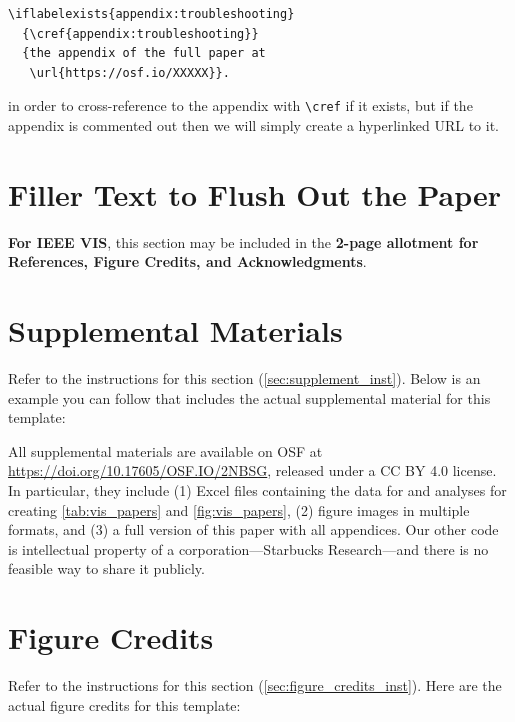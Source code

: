 \documentclass[journal]{vgtc}                     %
\begin{document}
\begin{verbatim}
\iflabelexists{appendix:troubleshooting}
  {\cref{appendix:troubleshooting}}
  {the appendix of the full paper at
   \url{https://osf.io/XXXXX}}.
\end{verbatim}

in order to cross-reference to the appendix with \verb|\cref| if it exists, but if the appendix is commented out then we will simply create a hyperlinked URL to it.


\section{Filler Text to Flush Out the Paper}

\lipsum[1-3]%



\textbf{For IEEE VIS}, this section may be included in the \textbf{2-page allotment for References, Figure Credits, and Acknowledgments}.


\section*{Supplemental Materials}
\label{sec:supplemental_materials}

Refer to the instructions for this section (\cref{sec:supplement_inst}).
Below is an example you can follow that includes the actual supplemental material for this template:

All supplemental materials are available on OSF at \url{https://doi.org/10.17605/OSF.IO/2NBSG}, released under a CC BY 4.0 license.
In particular, they include (1) Excel files containing the data for and analyses for creating \cref{tab:vis_papers} and \cref{fig:vis_papers}, (2) figure images in multiple formats, and (3) a full version of this paper with all appendices.
Our other code is intellectual property of a corporation---Starbucks Research---and there is no feasible way to share it publicly.


\section*{Figure Credits}
\label{sec:figure_credits}

Refer to the instructions for this section (\cref{sec:figure_credits_inst}).
Here are the actual figure credits for this template:
\end{document}
